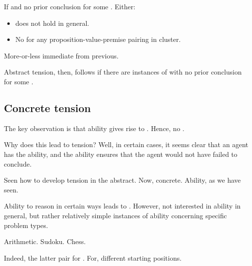 \begin{note}
  \begin{proposition}
    If \ragCluster{} and no prior conclusion for some \jag{}.
    Either:
    \begin{itemize}
    \item
      \ESU{} does not hold in general.
    \item
      No \csVImp{} for any proposition-value-premise pairing in cluster.
    \end{itemize}
      \begin{argument}
    More-or-less immediate from previous.
  \end{argument}
  \end{proposition}
\end{note}

\begin{note}
  Abstract tension, then, follows if there are instances of  with no prior conclusion for some \jag{}.
\end{note}

\subsection{Concrete tension}
\label{sec:concrete-tension}

\begin{note}
  \color{red}
  The key observation is that ability gives rise to .
  Hence, no \csN{}.

  Why does this lead to tension?
  Well, in certain cases, it seems clear that an agent has the ability, and the ability ensures that the agent would not have failed to conclude.
\end{note}

\begin{note}
  Seen how to develop tension in the abstract.
  Now, concrete.
  Ability, as we have seen.
\end{note}

\begin{note}[Ability]
  Ability to reason in certain ways leads to .
  However, not interested in ability in general, but rather relatively simple instances of ability concerning specific problem types.

  Arithmetic.
  Sudoku.
  Chess.

  Indeed, the latter pair for .
  For, different starting positions.
\end{note}

